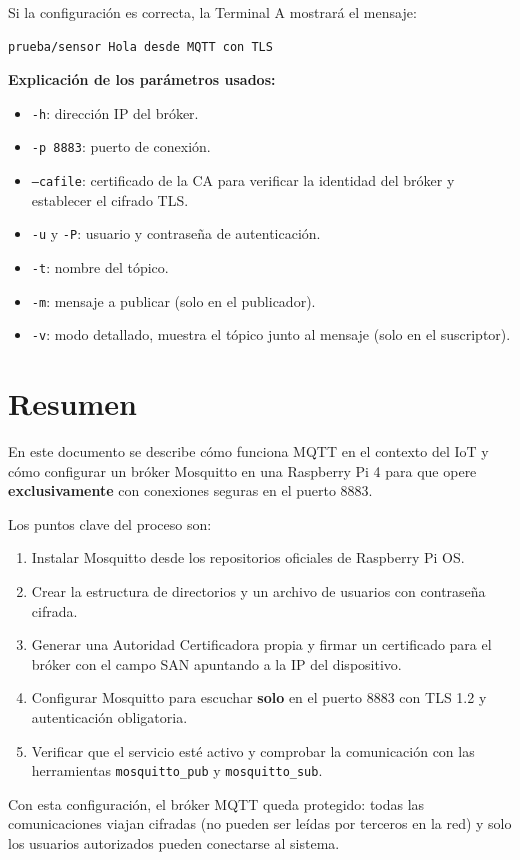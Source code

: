 \documentclass[12pt,a4paper]{article}
\begin{document}
Si la configuración es correcta, la Terminal A mostrará el mensaje:

\begin{lstlisting}[style=config]
prueba/sensor Hola desde MQTT con TLS
\end{lstlisting}

\textbf{Explicación de los parámetros usados:}

\begin{itemize}
  \item \texttt{-h}: dirección IP del bróker.
  \item \texttt{-p 8883}: puerto de conexión.
  \item \texttt{--cafile}: certificado de la CA para verificar la identidad del
    bróker y establecer el cifrado TLS.
  \item \texttt{-u} y \texttt{-P}: usuario y contraseña de autenticación.
  \item \texttt{-t}: nombre del tópico.
  \item \texttt{-m}: mensaje a publicar (solo en el publicador).
  \item \texttt{-v}: modo detallado, muestra el tópico junto al mensaje (solo
    en el suscriptor).
\end{itemize}

\section{Resumen}

En este documento se describe cómo funciona MQTT en el contexto del IoT y cómo
configurar un bróker Mosquitto en una Raspberry Pi 4 para que opere
\textbf{exclusivamente} con conexiones seguras en el puerto 8883.

Los puntos clave del proceso son:

\begin{enumerate}
  \item Instalar Mosquitto desde los repositorios oficiales de Raspberry Pi OS.
  \item Crear la estructura de directorios y un archivo de usuarios con
    contraseña cifrada.
  \item Generar una Autoridad Certificadora propia y firmar un certificado para
    el bróker con el campo SAN apuntando a la IP del dispositivo.
  \item Configurar Mosquitto para escuchar \textbf{solo} en el puerto 8883 con
    TLS 1.2 y autenticación obligatoria.
  \item Verificar que el servicio esté activo y comprobar la comunicación con
    las herramientas \texttt{mosquitto\_pub} y \texttt{mosquitto\_sub}.
\end{enumerate}

Con esta configuración, el bróker MQTT queda protegido: todas las
comunicaciones viajan cifradas (no pueden ser leídas por terceros en la red) y
solo los usuarios autorizados pueden conectarse al sistema.
\end{document}
